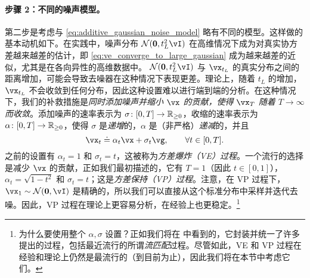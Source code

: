 \documentclass[../../book-main.tex]{subfiles}
\begin{document}
\paragraph{步骤 2：不同的噪声模型。} 第二步是考虑与 \eqref{eq:additive_gaussian_noise_model} 略有不同的模型。这样做的基本动机如下。在实践中，噪声分布 \(\dNorm(\vzero, t_{L}^{2}\vI)\) 在高维情况下成为对真实协方差越来越差的估计，即 \eqref{eq:ve_converge_to_large_gaussian} 成为越来越差的近似，尤其是在各向异性的高维数据中。 \(\dNorm(\vzero, t_{L}^{2}\vI)\) 与 \(\vx_{t_{L}}\) 的真实分布之间的距离增加，可能会导致去噪器在这种情况下表现更差。理论上，随着 \(t_{L}\) 的增加，\(\vx_{t_{L}}\) 不会收敛到任何分布，因此这种设置难以进行端到端的分析。在这种情况下，我们的补救措施是\textit{同时添加噪声并缩小 \(\vx\) 的贡献，使得 \(\vx_{T}\) 随着 \(T \to \infty\) 而收敛}。添加噪声的速率表示为 \(\sigma \colon [0, T] \to \mathbb{R}_{\geq 0}\)，收缩的速率表示为 \(\alpha \colon [0, T] \to \mathbb{R}_{\geq 0}\)，使得 \(\sigma\) 是\textit{递增}的，\(\alpha\) 是（非严格）\textit{递减}的，并且
\begin{equation}\label{eq:gen_additive_gaussian_noise_model}
	\vx_{t} \doteq \alpha_{t}\vx + \sigma_{t}\vg, \qquad \forall t \in [0, T].
\end{equation}
之前的设置有 \(\alpha_{t} = 1\) 和 \(\sigma_{t} = t\)，这被称为\textit{方差爆炸（VE）过程}。一个流行的选择是减少 \(\vx\) 的贡献，正如我们最初描述的，它有 \(T = 1\)（因此 \(t \in [0, 1]\)），\(\alpha_{t} = \sqrt{1 - t^{2}}\) 和 \(\sigma_{t} = t\)；这是\textit{方差保持（VP）过程}。注意，在 VP 过程下，\(\vx_{1} \sim \dNorm(\vzero, \vI)\) 是精确的，所以我们可以直接从这个标准分布中采样并迭代去噪。因此，VP 过程在理论上更容易分析，在经验上也更稳定。\footnote{为什么要使用整个 \(\alpha, \sigma\) 设置？正如我们将在  中看到的，它封装并统一了许多提出的过程，包括最近流行的所谓\textit{流匹配}过程。尽管如此，VE 和 VP 过程在经验和理论上仍然是最流行的（到目前为止），因此我们将在本节中考虑它们。}
\end{document}
